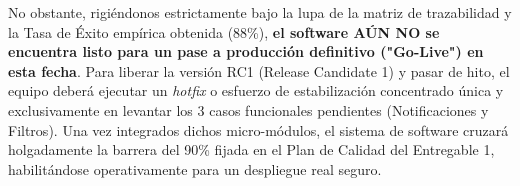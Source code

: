 No obstante, rigiéndonos estrictamente bajo la lupa de la matriz de trazabilidad y la Tasa de Éxito empírica obtenida (88\%), \textbf{el software AÚN NO se encuentra listo para un pase a producción definitivo ("Go-Live") en esta fecha}. Para liberar la versión RC1 (Release Candidate 1) y pasar de hito, el equipo deberá ejecutar un \textit{hotfix} o esfuerzo de estabilización concentrado única y exclusivamente en levantar los 3 casos funcionales pendientes (Notificaciones y Filtros). Una vez integrados dichos micro-módulos, el sistema de software cruzará holgadamente la barrera del 90\% fijada en el Plan de Calidad del Entregable 1, habilitándose operativamente para un despliegue real seguro.
